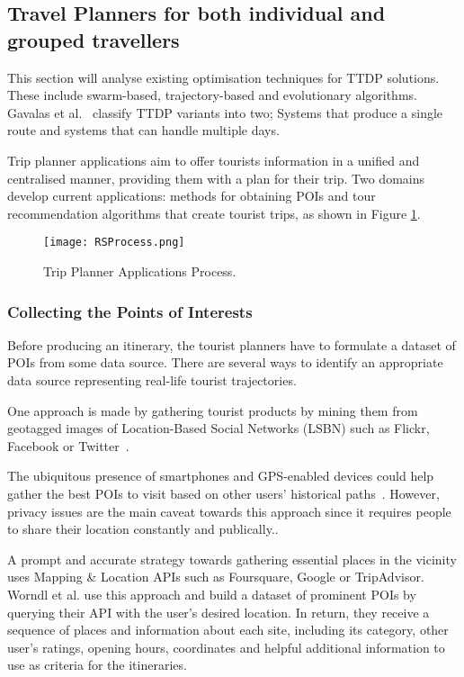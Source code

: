 \subsection{Travel Planners for both individual and grouped travellers}

This section will analyse existing optimisation
techniques for TTDP solutions. These include
swarm-based, trajectory-based and evolutionary
algorithms. Gavalas et al.~\cite{Gavalas2014a}
classify TTDP variants into two; Systems that produce
a single route and systems that can handle multiple
days. 

Trip planner applications aim to offer tourists
information in a unified and centralised manner,
providing them with a plan for their trip. Two domains
develop current applications: methods for obtaining
POIs and tour recommendation algorithms that create
tourist trips, as shown in Figure \ref{RS}.

\begin{figure}[h]
\centering
\texttt{[image: RSProcess.png]}
\caption{Trip Planner Applications Process.}
\label{RS}
\end{figure}

\subsubsection{Collecting the Points of Interests}

Before producing an itinerary, the tourist planners have to
formulate a dataset of POIs from some data source. There are
several ways to identify an appropriate data source representing
real-life tourist trajectories. 

One approach is made by gathering tourist products by mining them from
geotagged images of Location-Based Social Networks (LSBN) such as Flickr,
Facebook or Twitter~\cite{DeChoudhury2010, Memon2015, Lucchese2012, Lim2018a,
HuiLim, HuiLima, Kurashima2013, Kurashima2010, Brilhante2013, Brilhante2015 }.

The ubiquitous presence of smartphones and GPS-enabled devices
could help gather the best POIs to visit based on other users'
historical paths~\cite{10.1145/1889681.1889683,
10.1145/1526709.1526816, Chen2011a}. However, privacy issues are the main caveat
towards this approach since it requires people to share their
location constantly and publically\cite{Lim2018}..

A prompt and accurate strategy towards gathering essential places
in the vicinity uses Mapping \& Location APIs such as Foursquare,
Google or TripAdvisor. Worndl et al.\cite{Worndl2017} use this approach and build a
dataset of prominent POIs by querying their API with the user's
desired location. In return, they receive a sequence of places and
information about each site, including its category, other user's
ratings, opening hours, coordinates and helpful additional
information to use as criteria for the itineraries.


